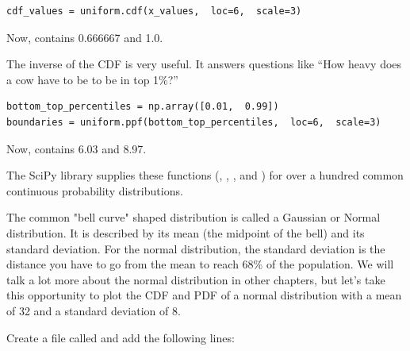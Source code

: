 \begin{verbatim}
cdf_values = uniform.cdf(x_values,  loc=6,  scale=3)
\end{verbatim}

Now,  contains 0.666667 and 1.0.

The inverse of the CDF is very useful.  It answers questions like ``How heavy does a cow have to be to be in top 1\%?''

\begin{verbatim}
bottom_top_percentiles = np.array([0.01,  0.99])
boundaries = uniform.ppf(bottom_top_percentiles,  loc=6,  scale=3)
\end{verbatim}

Now,  contains 6.03 and 8.97.

The SciPy library supplies these functions (, ,  , and ) for over a hundred 
common continuous probability distributions.  

The common "bell curve" shaped distribution is called a Gaussian  or Normal distribution. It is described by its mean (the midpoint of the bell) and its standard deviation.  For the normal distribution,  the standard deviation is the distance you have to go from the mean to reach 68\% of the population. 
We will talk a lot more about the normal distribution in other chapters,  but let's take this opportunity to plot the CDF and PDF of a normal distribution with a mean of 32 and a standard deviation of 8.

Create a file called  and add the following lines:


